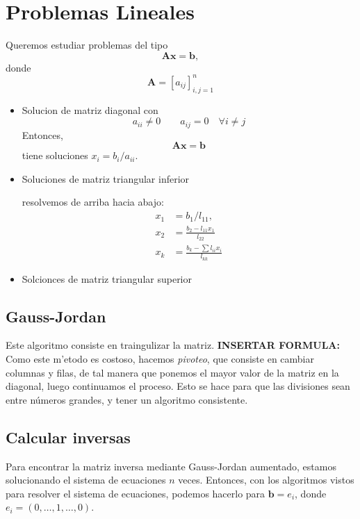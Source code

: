 \documentclass{article}
\theoremstyle{problemstyle}
\newcommand{\A}{\mathbf A}
\newcommand{\x}{\mathbf x}
\newcommand{\bv}{\mathbf b}
\begin{document}
  \section{Problemas Lineales}\label{sec:problemas_lineales} %
  
  Queremos estudiar problemas del tipo
  \[
    \A \x = \bv,
  \]
  donde 
  \[
    \A = [a_{i j}]_{i, j = 1}^{n}
  \]
  \begin{itemize}
    \item Solucion de matriz diagonal con 
      \[
        a_{ii} \neq 0\qquad a_{ij} = 0 \quad \forall i\neq j
      \]
      Entonces,
      \[
        \A\x = \bv
      \]
      tiene soluciones $ x_i =b_{i}/a_{ii} $.
    \item Soluciones de matriz triangular inferior
  
      resolvemos de arriba hacia abajo:
      \begin{align*}
        x_1 &= b_{1}/l_{11},\\
        x_2 &= \frac{b_2 - l_{11}x_1}{l_{22}}\\
        x_k &= \frac{b_{k} - \sum l_{ii}x_i}{l_{kk}}
      \end{align*}
    \item Solcionces de matriz triangular superior


  \end{itemize}
  \subsection{Gauss-Jordan}
  Este algoritmo consiste en traingulizar la matriz. \textbf{INSERTAR FORMULA:}
  Como este m'etodo es costoso, hacemos \textit{pivoteo}, que consiste en cambiar columnas y filas, de tal manera que ponemos el mayor valor de la matriz en la diagonal, luego continuamos el proceso. Esto se hace para que las divisiones sean entre n\'umeros grandes, y tener un algoritmo consistente. 

  \subsection{Calcular inversas}
  Para encontrar la matriz inversa mediante Gauss-Jordan aumentado, estamos solucionando el sistema de ecuaciones $ n $ veces. Entonces, con los algoritmos vistos para resolver el sistema de ecuaciones, podemos hacerlo para $ \bv = e_i $, donde $ e_i = (0,\dots, 1, \dots, 0) $. 
\end{document}

